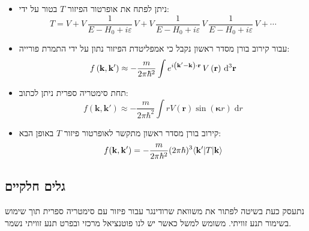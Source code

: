 \documentclass{tstextbook}
\begin{document}
\begin{summary}
  \begin{itemize}
    \item ניתן לפתח את אופרטור הפיזור \(T\) בטור על ידי:
$$T=V+V\,\frac{1}{E-H_{0}+i\varepsilon}\,V+V\,\frac{1}{E-H_{0}+i\varepsilon}\,V\,\frac{1}{E-H_{0}+i\varepsilon}\,V+\cdots$$
    \item עבור קירוב בורן מסדר ראשון נקבל כי אמפליטדת הפיזור נתון על ידי התמרת פורייה:
$$f\left( {\bf k},{\bf k^{\prime}} \right)\approx-\frac{m}{2\pi\hbar^{2}}\int e^{i\left( {\bf k^{\prime}}-{\bf k} \right)\cdot{\bf r}}\,V\left( {\bf r} \right)\,\mathrm{d}^{3}{\bf r}$$
    \item תחת סימטריה ספרית ניתן לכתוב:
$$f \left( \mathbf{k,k'} \right)\approx -\frac{m}{2\pi \hbar^{2}}\int r V\left( \mathbf{r} \right)\sin\left( \boldsymbol\kappa r \right)\;\mathrm{d} r $$
    \item קירוב בורן מסדר ראשון מתקשר לאופרטור פיזור \(T\) באופן הבא:
$$f({\bf k},{\bf k^{\prime}})=-\frac{m}{2\pi\hbar^{2}}(2\pi\hbar)^{3}\langle{\bf k^{\prime}}|T|{\bf k}\rangle$$
  \end{itemize}
\end{summary}
\subsection{גלים חלקיים}

נתעסק כעת בשיטה לפתור את משוואת שרודינגר עבור פיזור עם סימטריה ספרית תוך שימוש בשימור תנע זוויתי. משומש למשל כאשר יש לנו פוטנציאל מרכזי ובפרט תנע זוויתי נשמר. 
\end{document}
